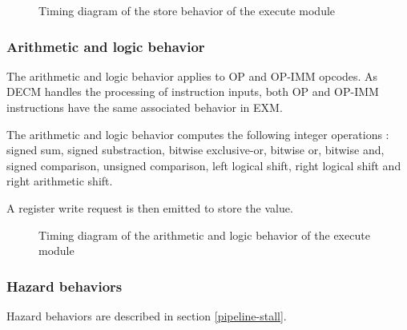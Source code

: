       \begin{figure}[H]
          \centering
          
          \caption{Timing diagram of the store behavior of the execute module}
          \label{fig:exm-behavior-store}
        \end{figure}

      

    \subsubsection{Arithmetic and logic behavior}

      \begin{content}
          The arithmetic and logic behavior applies to OP and OP-IMM opcodes. As DECM handles the processing of instruction inputs, both OP and OP-IMM instructions have the same associated behavior in EXM.

          The arithmetic and logic behavior computes the following integer operations : signed sum, signed substraction, bitwise exclusive-or, bitwise or, bitwise and, signed comparison, unsigned comparison, left logical shift, right logical shift and right arithmetic shift.
          
          A register write request is then emitted to store the value.
        \end{content}

      \begin{figure}[H]
          \centering
          
          \caption{Timing diagram of the arithmetic and logic behavior of the execute module}
          \label{fig:exm-behavior-arithmetic-logic}
        \end{figure}

      

    \subsubsection{Hazard behaviors}

      \begin{content}
          Hazard behaviors are described in section \ref{pipeline-stall}.
        \end{content}

\newpage

